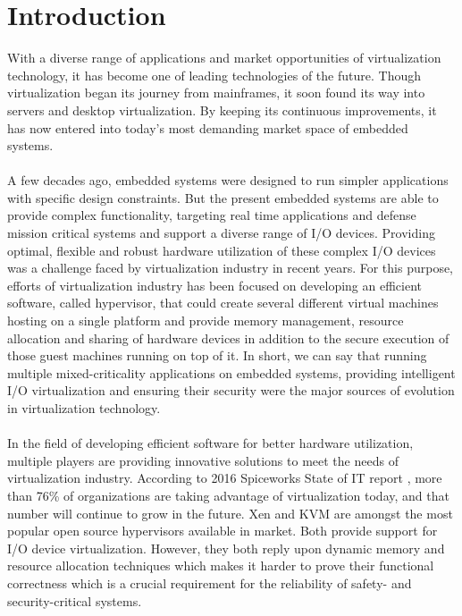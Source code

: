\chapter{Introduction \label{cha:chapter1}}

With a diverse range of applications and market opportunities of virtualization technology, it has become one of leading technologies of the future. Though virtualization began its journey from mainframes, it soon found its way into servers and desktop virtualization. By keeping its continuous improvements, it has now entered into today's most demanding market space of embedded systems.
\\
\\
A few decades ago, embedded systems were designed to run simpler applications with specific design constraints. But the present embedded systems are able to provide complex functionality, targeting real time applications and defense mission critical systems and support a diverse range of I/O devices. Providing optimal, flexible and robust hardware utilization of these complex I/O devices was a challenge faced by virtualization industry in recent years. For this purpose, efforts of virtualization industry has been focused on developing an efficient software, called hypervisor, that could create several different virtual machines hosting on a single platform and provide memory management, resource allocation and sharing of hardware devices in addition to the secure execution of those guest machines running on top of it. In short, we can say that running multiple mixed-criticality applications on embedded systems, providing intelligent I/O virtualization and ensuring their security were the major sources of evolution in virtualization technology. 
\\
\\
In the field of developing efficient software for better hardware utilization, multiple players are providing innovative solutions to meet the needs of virtualization industry. According to 2016 Spiceworks State of IT report \cite{spiceworks}, more than 76\% of organizations are taking advantage of virtualization today, and that number will continue to grow in the future. Xen and KVM are amongst the most popular open source hypervisors available in market. Both provide support for I/O device virtualization. However, they both reply upon dynamic memory and resource allocation techniques which makes it harder to prove their functional correctness which is a crucial requirement for the reliability of safety- and security-critical systems.
